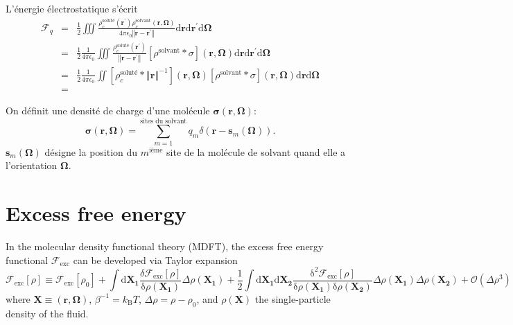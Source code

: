 L'énergie électrostatique s'écrit
\begin{eqnarray}
\mathcal{F}_{q} & = & \frac{1}{2}\iiint\frac{\rho_{c}^{\textrm{soluté}}\left(\boldsymbol{r^{\prime}}\right)\rho_{c}^{\textrm{solvant}}\left(\boldsymbol{r},\boldsymbol{\Omega}\right)}{4\pi\epsilon_{0}\left\Vert \boldsymbol{r}-\boldsymbol{r^{\prime}}\right\Vert }\textrm{d}\boldsymbol{r}\textrm{d}\boldsymbol{r^{\prime}}\textrm{d}\boldsymbol{\Omega}\\
 & = & \frac{1}{2}\frac{1}{4\pi\epsilon_{0}}\iiint\frac{\rho_{c}^{\textrm{soluté}}\left(\boldsymbol{r^{\prime}}\right)}{\left\Vert \boldsymbol{r}-\boldsymbol{r^{\prime}}\right\Vert }\left[\rho^{\textrm{solvant}}*\sigma\right]\left(\boldsymbol{r},\boldsymbol{\Omega}\right)\textrm{d}\boldsymbol{r}\textrm{d}\boldsymbol{r^{\prime}}\textrm{d}\boldsymbol{\Omega}\\
 & = & \frac{1}{2}\frac{1}{4\pi\epsilon_{0}}\iint\left[\rho_{c}^{\textrm{soluté}}*\left\Vert \boldsymbol{r}\right\Vert ^{-1}\right]\left(\boldsymbol{r},\boldsymbol{\Omega}\right)\left[\rho^{\textrm{solvant}}*\sigma\right]\left(\boldsymbol{r},\boldsymbol{\Omega}\right)\textrm{d}\boldsymbol{r}\textrm{d}\boldsymbol{\Omega}\\
 & =
\end{eqnarray}


On définit une densité de charge d'une molécule $\boldsymbol{\sigma}\left(\boldsymbol{r},\boldsymbol{\Omega}\right)$:
\begin{equation}
\boldsymbol{\sigma}\left(\boldsymbol{r},\boldsymbol{\Omega}\right)=\sum_{m=1}^{\textrm{sites du solvant}}q_{m}\delta\left(\boldsymbol{r}-\boldsymbol{s}_{m}\left(\boldsymbol{\Omega}\right)\right).
\end{equation}
$\boldsymbol{s}_{m}\left(\boldsymbol{\Omega}\right)$ désigne la position
du $m^{\textrm{ième}}$ site de la molécule de solvant quand elle
a l'orientation $\boldsymbol{\Omega}$.


\section{Excess free energy}

In the molecular density functional theory (MDFT), the excess free
energy functional $\mathcal{F}_{\mathrm{exc}}$ can be developed via
Taylor expansion 
\begin{equation}
\mathcal{F}_{\mathrm{exc}}\left[\rho\right]\equiv\mathcal{F}_{\mathrm{exc}}\left[\rho_{0}\right]+\int\mathrm{d}\mathbf{X_{1}}\frac{\delta\mathcal{F}_{\mathrm{exc}}\left[\rho\right]}{\mathrm{\delta}\rho(\mathbf{X_{1}})}\Delta\rho(\mathbf{X_{1}})+\frac{1}{2}\int\mathrm{d}\mathbf{X_{1}}\mathrm{d}\mathbf{X_{2}}\frac{\mathrm{\delta}^{2}\mathcal{F}_{\mathrm{exc}}\left[\rho\right]}{\mathrm{\delta}\rho(\mathbf{X_{1}})\mathrm{\delta}\rho(\mathbf{X_{2}})}\Delta\rho(\mathbf{X_{1}})\Delta\rho(\mathbf{X_{2}})+\mathcal{O}(\Delta\rho^{3})\label{eq:Taylor-1}
\end{equation}
where $\mathbf{X}\equiv(\mathbf{r},\mathbf{\Omega})$, $\beta^{-1}=k_{\mathrm{B}}T$,
$\Delta\rho=\rho-\rho_{0}$, and $\rho(\mathbf{X})$ the single-particle
density of the fluid.


